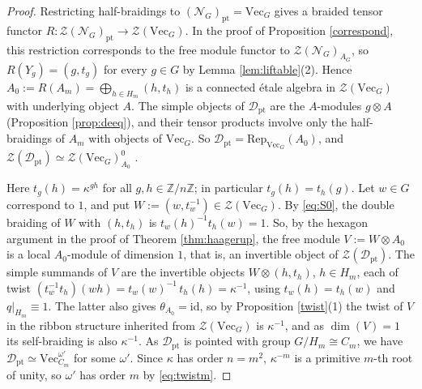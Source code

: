 \documentclass[10pt]{article}
\theoremstyle{plain}
\theoremstyle{definition}
\theoremstyle{plain}
\begin{document}
\begin{proof}
Restricting half-braidings to $(\mathcal{N}_G)_\mathrm{pt}=\mathrm{Vec}_G$ gives a braided tensor functor $R\colon\mathcal{Z}(\mathcal{N}_G)_\mathrm{pt}\to\mathcal{Z}(\mathrm{Vec}_G)$. In the proof of Proposition \ref{correspond}, this restriction corresponds to the free module functor to $\mathcal{Z}(\mathcal{N}_G)_{A_G}$, so $R(Y_g)=(g,t_g)$ for every $g\in G$ by Lemma \ref{lem:liftable}(2). Hence $A_0:=R(A_m)=\bigoplus_{h\in H_m}(h,t_h)$ is a connected \'etale algebra in $\mathcal{Z}(\mathrm{Vec}_G)$ with underlying object $A$. The simple objects of $\mathcal{D}_\mathrm{pt}$ are the $A$-modules $g\otimes A$ (Proposition \ref{prop:deeq}), and their tensor products involve only the half-braidings of $A_m$ with objects of $\mathrm{Vec}_G$. So $\mathcal{D}_\mathrm{pt}=\mathrm{Rep}_{\mathrm{Vec}_G}(A_0)$, and $\mathcal{Z}(\mathcal{D}_\mathrm{pt})\simeq\mathcal{Z}(\mathrm{Vec}_G)^0_{A_0}$ \cite[Theorem 3.20]{MR3039775}.

Here $t_g(h)=\kappa^{gh}$ for all $g,h\in\mathbb{Z}/n\mathbb{Z}$; in particular $t_g(h)=t_h(g)$. Let $w\in G$ correspond to $1$, and put $W:=(w,t_w^{-1})\in\mathcal{Z}(\mathrm{Vec}_G)$. By \eqref{eq:S0}, the double braiding of $W$ with $(h,t_h)$ is $t_w(h)^{-1}t_h(w)=1$. So, by the hexagon argument in the proof of Theorem \ref{thm:haagerup}, the free module $V:=W\otimes A_0$ is a local $A_0$-module of dimension $1$, that is, an invertible object of $\mathcal{Z}(\mathcal{D}_\mathrm{pt})$. The simple summands of $V$ are the invertible objects $W\otimes(h,t_h)$, $h\in H_m$, each of twist $(t_w^{-1}t_h)(wh)=t_w(w)^{-1}\,t_h(h)=\kappa^{-1}$, using $t_w(h)=t_h(w)$ and $q|_{H_m}\equiv1$. The latter also gives $\theta_{A_0}=\mathrm{id}$, so by Proposition \ref{twist}(1) the twist of $V$ in the ribbon structure inherited from $\mathcal{Z}(\mathrm{Vec}_G)$ is $\kappa^{-1}$, and as $\dim(V)=1$ its self-braiding is also $\kappa^{-1}$. As $\mathcal{D}_\mathrm{pt}$ is pointed with group $G/H_m\cong C_m$, we have $\mathcal{D}_\mathrm{pt}\simeq\mathrm{Vec}^{\omega'}_{C_m}$ for some $\omega'$. Since $\kappa$ has order $n=m^2$, $\kappa^{-m}$ is a primitive $m$-th root of unity, so $\omega'$ has order $m$ by \eqref{eq:twistm}.
\end{proof}
\end{document}
